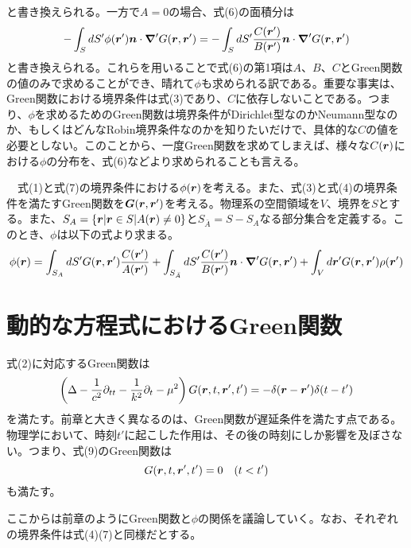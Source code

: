 \documentclass[dvipdfmx, 9pt, a4paper]{jsarticle}
\newcommand{\bm}[1]{{\mbox{\boldmath $#1$}}}
\newcommand{\bnabla}{\bm \nabla}
\begin{document}
と書き換えられる。一方で$A=0$の場合、式(6)の面積分は
\begin{equation}
-\int_S dS' \phi(\bm r')\bm n \cdot \bnabla' G(\bm r, \bm r')=-\int_S dS' \frac{C(\bm r')}{B(\bm r')}\bm n \cdot \bnabla' G(\bm r, \bm r') \notag
\end{equation}
と書き換えられる。これらを用いることで式(6)の第1項は$A$、$B$、$C$とGreen関数の値のみで求めることができ、晴れて$\phi$も求められる訳である。重要な事実は、Green関数における境界条件は式(3)であり、$C$に依存しないことである。つまり、$\phi$を求めるためのGreen関数は境界条件がDirichlet型なのかNeumann型なのか、もしくはどんなRobin境界条件なのかを知りたいだけで、具体的な$C$の値を必要としない。このことから、一度Green関数を求めてしまえば、様々な$C(\bm r)$における$\phi$の分布を、式(6)などより求められることも言える。

\begin{tcolorbox}[title=Helmholtz方程式型のGreen関数]
　式(1)と式(7)の境界条件における$\phi(\bm r)$を考える。また、式(3)と式(4)の境界条件を満たすGreen関数を$\bm G(\bm r, \bm r')$を考える。物理系の空間領域を$V$、境界を$S$とする。また、$S_A=\{ \bm r|\bm r \in S | A(\bm r)\neq 0 \}$と$S_{\bar A}=S-S_A$なる部分集合を定義する。このとき、$\phi$は以下の式より求まる。
\begin{equation}
\phi(\bm r)=\int_{S_A} dS' G(\bm r, \bm r')\frac{C(\bm r')}{A(\bm r')}+\int_{S_{\bar A}} dS' \frac{C(\bm r')}{B(\bm r')}\bm n \cdot \bnabla'G(\bm r, \bm r')+\int_Vd\bm r'G(\bm r, \bm r')\rho(\bm r')
\end{equation}
\end{tcolorbox}

\section{動的な方程式におけるGreen関数}
式(2)に対応するGreen関数は
\begin{equation}
\left(\Delta -\frac{1}{c^2}\partial_{tt}-\frac{1}{k^2}\partial_t-\mu^2 \right)G(\bm r, t, \bm r', t')=-\delta(\bm r-\bm r')\delta(t-t')
\end{equation}
を満たす。前章と大きく異なるのは、Green関数が遅延条件を満たす点である。物理学において、時刻$t'$に起こした作用は、その後の時刻にしか影響を及ぼさない。つまり、式(9)のGreen関数は
\begin{equation}
G(\bm r, t, \bm r', t')=0~~~(t < t')
\end{equation}
も満たす。\par
ここからは前章のようにGreen関数と$\phi$の関係を議論していく。なお、それぞれの境界条件は式(4)(7)と同様だとする。
\end{document}
